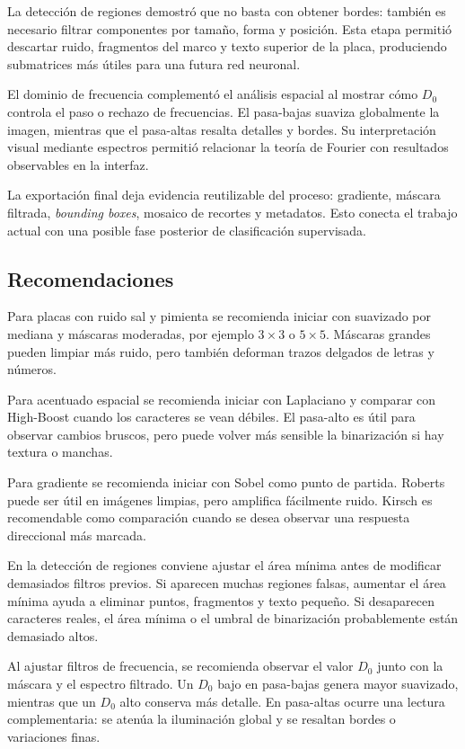 \documentclass[11pt]{article}
\begin{document}
La detección de regiones demostró que no basta con obtener bordes: también es necesario filtrar componentes por tamaño, forma y posición. Esta etapa permitió descartar ruido, fragmentos del marco y texto superior de la placa, produciendo submatrices más útiles para una futura red neuronal.

El dominio de frecuencia complementó el análisis espacial al mostrar cómo $D_0$ controla el paso o rechazo de frecuencias. El pasa-bajas suaviza globalmente la imagen, mientras que el pasa-altas resalta detalles y bordes. Su interpretación visual mediante espectros permitió relacionar la teoría de Fourier con resultados observables en la interfaz.

La exportación final deja evidencia reutilizable del proceso: gradiente, máscara filtrada, \textit{bounding boxes}, mosaico de recortes y metadatos. Esto conecta el trabajo actual con una posible fase posterior de clasificación supervisada.

\subsection{Recomendaciones}

Para placas con ruido sal y pimienta se recomienda iniciar con suavizado por mediana y máscaras moderadas, por ejemplo $3 \times 3$ o $5 \times 5$. Máscaras grandes pueden limpiar más ruido, pero también deforman trazos delgados de letras y números.

Para acentuado espacial se recomienda iniciar con Laplaciano y comparar con High-Boost cuando los caracteres se vean débiles. El pasa-alto es útil para observar cambios bruscos, pero puede volver más sensible la binarización si hay textura o manchas.

Para gradiente se recomienda iniciar con Sobel como punto de partida. Roberts puede ser útil en imágenes limpias, pero amplifica fácilmente ruido. Kirsch es recomendable como comparación cuando se desea observar una respuesta direccional más marcada.

En la detección de regiones conviene ajustar el área mínima antes de modificar demasiados filtros previos. Si aparecen muchas regiones falsas, aumentar el área mínima ayuda a eliminar puntos, fragmentos y texto pequeño. Si desaparecen caracteres reales, el área mínima o el umbral de binarización probablemente están demasiado altos.

Al ajustar filtros de frecuencia, se recomienda observar el valor $D_0$ junto con la máscara y el espectro filtrado. Un $D_0$ bajo en pasa-bajas genera mayor suavizado, mientras que un $D_0$ alto conserva más detalle. En pasa-altas ocurre una lectura complementaria: se atenúa la iluminación global y se resaltan bordes o variaciones finas.
\end{document}
